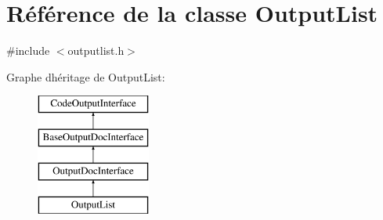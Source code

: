\hypertarget{class_output_list}{}\section{Référence de la classe Output\+List}
\label{class_output_list}


{\ttfamily \#include $<$outputlist.\+h$>$}

Graphe d\textquotesingle{}héritage de Output\+List\+:\begin{figure}[H]
\begin{center}
\leavevmode
\includegraphics[height=4.000000cm]{class_output_list}
\end{center}
\end{figure}
